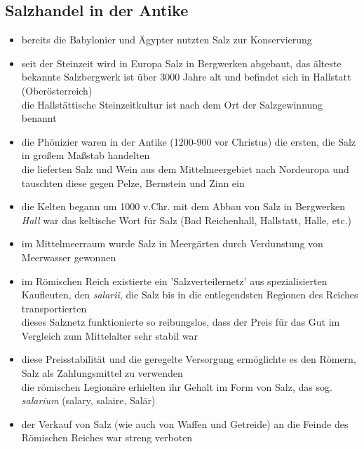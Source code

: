 \documentclass[11pt,a4paper]{article}
\begin{document}
\subsection*{\textsf{Salzhandel in der Antike}}

\begin{itemize}

\item bereits die Babylonier und Ägypter nutzten Salz zur Konservierung

\item seit der Steinzeit wird in Europa Salz in Bergwerken abgebaut, das älteste bekannte Salzbergwerk ist über 3000 Jahre alt und befindet sich in Hallstatt (Oberösterreich)\\
 die Hallstättische Steinzeitkultur ist nach dem Ort der Salzgewinnung benannt

\item die Phönizier waren in der Antike (1200-900 vor Christus) die ersten, die Salz in großem Maßstab handelten\\
 die lieferten Salz und Wein aus dem Mittelmeergebiet nach Nordeuropa und tauschten diese gegen Pelze, Bernstein und Zinn ein

\item die Kelten begann um 1000 v.Chr. mit dem Abbau von Salz in Bergwerken\\
 \textsl{Hall} war das keltische Wort für Salz (Bad Reichenhall, Hallstatt, Halle, etc.)

\item im Mittelmeerraum wurde Salz in Meergärten durch Verdunstung von Meerwasser gewonnen

\item im Römischen Reich existierte ein 'Salzverteilernetz' aus spezialisierten Kaufleuten, den \textsl{salarii}, die Salz bis in die entlegendsten Regionen des Reiches transportierten\\
 dieses Salznetz funktionierte so reibungslos, dass der Preis für das Gut im Vergleich zum Mittelalter sehr stabil war


\item diese Preisstabilität und die geregelte Versorgung ermöglichte es den Römern, Salz als Zahlungsmittel zu verwenden\\
 die römischen Legionäre erhielten ihr Gehalt im Form von Salz, das sog. \textsl{salarium} (salary, salaire, Salär)


\item der Verkauf von Salz (wie auch von Waffen und Getreide) an die Feinde des Römischen Reiches war streng verboten


\end{itemize}
\end{document}
